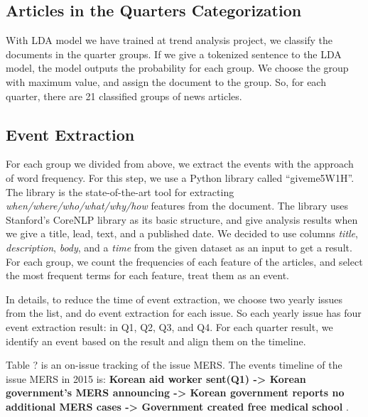 \subsection{Articles in the Quarters Categorization}

With LDA model we have trained at trend analysis project,
we classify the documents in the quarter groups.
If we give a tokenized sentence to the LDA model,
the model outputs the probability for each group.
We choose the group with maximum value, and assign the document to the group.
So, for each quarter, there are 21 classified groups of news articles.

\subsection{Event Extraction}

For each group we divided from above,
we extract the events with the approach of word frequency.
For this step, we use a Python library called ``giveme5W1H''.
The library is the state-of-the-art tool for extracting
\textit{when/where/who/what/why/how} features from the document.
The library uses Stanford's CoreNLP library as its basic structure,
and give analysis results when we give a
title, lead, text, and a published date.
We decided to use columns \textit{title}, \textit{description}, \textit{body}, and a \textit{time}
from the given dataset as an input to get a result.
For each group, we count the frequencies of each feature of the articles,
and select the most frequent terms for each feature, treat them as an event.

In details, to reduce the time of event extraction,
we choose two yearly issues from the list, and do event extraction for each issue.
So each yearly issue has four event extraction result: in Q1, Q2, Q3, and Q4.
For each quarter result, we identify an event based on the result and align them on the timeline.

Table ? is an on-issue tracking of the issue MERS.
The events timeline of the issue MERS in 2015 is: 
\textbf{
Korean aid worker sent(Q1) ->
Korean government's MERS announcing ->
Korean government reports no additional MERS cases ->
Government created free medical school
}.

